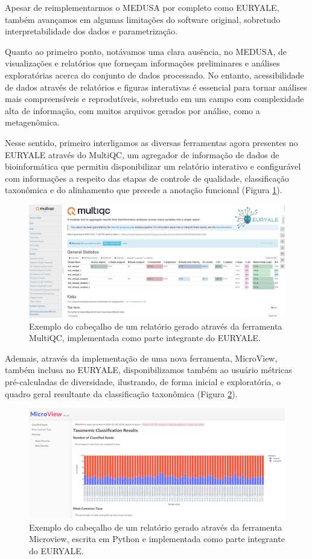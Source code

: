 \documentclass[
	12pt,				%
	oneside,			%
	a4paper,			%
	chapter=TITLE,		%
	section=TITLE,		%
	english,			%
	brazil				%
	]{abntex2}
\begin{document}
Apesar de reimplementarmos o MEDUSA por completo como EURYALE, também avançamos em algumas limitações do software original, sobretudo interpretabilidade dos dados e parametrização.

Quanto ao primeiro ponto, notávamos uma clara ausência, no MEDUSA, de visualizações e relatórios que forneçam informações preliminares e análises exploratórias acerca do conjunto de dados processado. No entanto, acessibilidade de dados através de relatórios e figuras interativas é essencial para tornar análises mais compreensíveis e reprodutíveis, sobretudo em um campo com complexidade alta de informação, com muitos arquivos gerados por análise, como a metagenômica.

Nesse sentido, primeiro interligamos as diversas ferramentas agora presentes no EURYALE através do MultiQC, um agregador de informação de dados de bioinformática \autocite{ewels2016} que permitiu disponibilizar um relatório interativo e configurável com informações a respeito das etapas de controle de qualidade, classificação taxonômica e do alinhamento que precede a anotação funcional (Figura \ref{fig:multiqc}).
\begin{figure}[H]

{\centering \includegraphics[width=0.7\linewidth]{figure/multiqc_example} 

}

\caption{Exemplo do cabeçalho de um relatório gerado através da ferramenta MultiQC, implementada como parte integrante do EURYALE.}\label{fig:multiqc}
\end{figure}
Ademais, através da implementação de uma nova ferramenta, MicroView, também inclusa no EURYALE, disponibilizamos também ao usuário métricas pré-calculadas de diversidade, ilustrando, de forma inicial e exploratória, o quadro geral resultante da classificação taxonômica (Figura \ref{fig:microview}).
\begin{figure}[H]

{\centering \includegraphics[width=0.7\linewidth]{figure/microview_example} 

}

\caption{Exemplo do cabeçalho de um relatório gerado através da ferramenta Microview, escrita em Python e implementada como parte integrante do EURYALE.}\label{fig:microview}
\end{figure}
\end{document}
